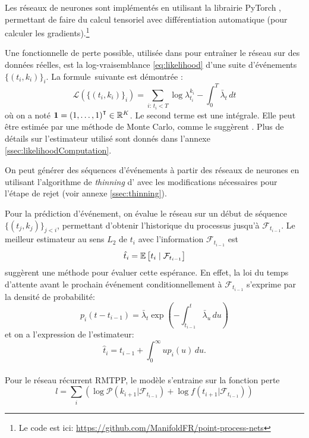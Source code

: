 \documentclass[../main.tex]{subfiles}
\begin{document}
	
Les réseaux de neurones sont implémentés en utilisant la librairie \textsf{PyTorch} \cite{paszke2017automatic}, permettant de faire du calcul tensoriel avec différentiation automatique (pour calculer les gradients).\footnote{Le code est ici: \url{https://github.com/ManifoldFR/point-process-nets}}

Une fonctionnelle de perte possible, utilisée dans \autocite{meiEisnerNeuralHawkes} pour entraîner le réseau sur des données réelles, est la log-vraisemblance \eqref{eq:likelihood} d'une suite d'événements $\{(t_i,k_i)\}_i$. La formule\footnotemark~suivante est démontrée \cite[15]{meiEisnerNeuralHawkes}: 
\begin{equation}\label{eq:explicitLikelihood}
\mathcal{L}\left(\{(t_i,k_i)\}_i\right)
=
\sum_{i:\, t_i < T} \log\lambda^{k_i}_{t_i} - \int_0^T \bar\lambda_t\,dt
\end{equation}
où on a noté $\mathbf{1} = {(1,\ldots,1)}^\intercal\in\mathbb{R}^K$. Le second terme est une intégrale. Elle peut être estimée par une méthode de Monte Carlo, comme le suggèrent \citeauthor{meiEisnerNeuralHawkes}. Plus de détails sur l'estimateur utilisé sont donnés dans l'annexe \ref{ssec:likelihoodComputation}.


On peut générer des séquences d'événements à partir des réseaux de neurones en utilisant l'algorithme de \textit{thinning} d'\citeauthor{ogata1981} \autocite{ogata1981} avec les modifications nécessaires pour l'étape de rejet (voir annexe \ref{ssec:thinning}).

Pour la prédiction d'événement, on évalue le réseau sur un début de séquence $\{(t_j,k_j)\}_{j < i}$, permettant d'obtenir l'historique du processus jusqu'à $\mathcal{F}_{t_{i-1}}$. Le meilleur estimateur au sens $L_2$ de $t_i$ avec l'information $\mathcal{F}_{t_{i-1}}$ est
\[
	\hat{t}_i = \mathbb{E}\left[ t_i \mid \mathcal{F}_{t_{i-1}} \right]
\]
\citeauthor{meiEisnerNeuralHawkes} suggèrent une méthode pour évaluer cette espérance. En effet, la loi du temps d'attente avant le prochain événement conditionnellement à $\mathcal{F}_{t_{i-1}}$ s'exprime par la densité de probabilité:
\begin{equation}\label{eq:nextIncrementDensity}
	p_i(t-t_{i-1}) = \bar\lambda_t\exp\left(-\int_{t_{i-1}}^t\bar\lambda_u\,du\right)
\end{equation}
et on a l'expression de l'estimateur:
\begin{equation}\label{eq:nextEventTimeEstimator}
	\hat{t}_i = t_{i-1} + \int_0^\infty u p_i(u)\,du.
\end{equation}

\paragraph{}
Pour le réseau récurrent RMTPP, le modèle s'entraine sur la fonction perte
\begin{equation}
l =  \sum_i(\log\mathcal{P}(k_{i+1} | \mathcal{F}_{t_{i-1}}) + \log f(t_{i+1}|  \mathcal{F}_{t_{i-1}}   )  )
\end{equation}
\end{document}
